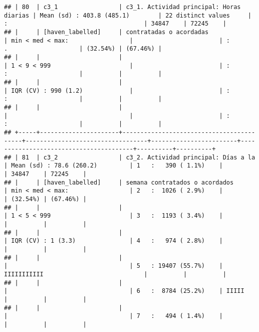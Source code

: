 \documentclass[]{article}
\begin{document}
\begin{verbatim}
## | 80  | c3_1                 | c3_1. Actividad principal: Horas diarias | Mean (sd) : 403.8 (485.1)        | 22 distinct values     | :                                      | 34847    | 72245    |
## |     | [haven_labelled]     | contratadas o acordadas                  | min < med < max:                 |                        | :                 .                    | (32.54%) | (67.46%) |
## |     |                      |                                          | 1 < 9 < 999                      |                        | :                 :                    |          |          |
## |     |                      |                                          | IQR (CV) : 990 (1.2)             |                        | :                 :                    |          |          |
## |     |                      |                                          |                                  |                        | :                 :                    |          |          |
## +-----+----------------------+------------------------------------------+----------------------------------+------------------------+----------------------------------------+----------+----------+
## | 81  | c3_2                 | c3_2. Actividad principal: Días a la     | Mean (sd) : 78.6 (260.2)         | 1   :   390 ( 1.1%)    |                                        | 34847    | 72245    |
## |     | [haven_labelled]     | semana contratados o acordados           | min < med < max:                 | 2   :  1026 ( 2.9%)    |                                        | (32.54%) | (67.46%) |
## |     |                      |                                          | 1 < 5 < 999                      | 3   :  1193 ( 3.4%)    |                                        |          |          |
## |     |                      |                                          | IQR (CV) : 1 (3.3)               | 4   :   974 ( 2.8%)    |                                        |          |          |
## |     |                      |                                          |                                  | 5   : 19407 (55.7%)    | IIIIIIIIIII                            |          |          |
## |     |                      |                                          |                                  | 6   :  8784 (25.2%)    | IIIII                                  |          |          |
## |     |                      |                                          |                                  | 7   :   494 ( 1.4%)    |                                        |          |          |

\end{verbatim}
\end{document}
